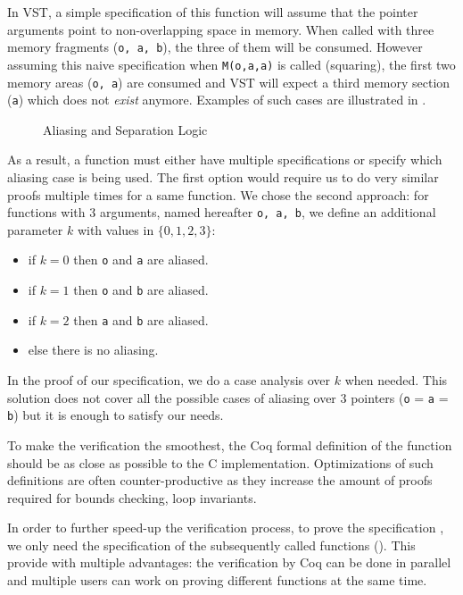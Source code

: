 In VST, a simple specification of this function will assume that the pointer arguments
point to non-overlapping space in memory.
When called with three memory fragments (\texttt{o, a, b}),
the three of them will be consumed. However assuming this naive specification
when \texttt{M(o,a,a)} is called (squaring), the first two memory areas (\texttt{o, a})
are consumed and VST will expect a third memory section (\texttt{a}) which does not \emph{exist} anymore.
Examples of such cases are illustrated in .
\begin{figure}[h]%
      \centering%
      \caption{Aliasing and Separation Logic}%
      \label{tikz:MemSame}%
\end{figure}
As a result, a function must either have multiple specifications or specify which
aliasing case is being used.
The first option would require us to do very similar proofs multiple times for a same function.
We chose the second approach: for functions with 3 arguments, named hereafter \texttt{o, a, b},
we define an additional parameter $k$ with values in $\{0,1,2,3\}$:
\begin{itemize}
      \item if $k=0$ then \texttt{o} and \texttt{a} are aliased.
      \item if $k=1$ then \texttt{o} and \texttt{b} are aliased.
      \item if $k=2$ then \texttt{a} and \texttt{b} are aliased.
      \item else there is no aliasing.
\end{itemize}
In the proof of our specification, we do a case analysis over $k$ when needed.
This solution does not cover all the possible cases of aliasing over 3 pointers
(\eg \texttt{o} = \texttt{a} = \texttt{b}) but it is enough to satisfy our needs.

To make the verification the smoothest, the Coq formal definition of the function
should be as close as possible to the C implementation.
Optimizations of such definitions are often counter-productive as they increase the
amount of proofs required for \eg bounds checking, loop invariants.

In order to further speed-up the verification process, to prove the specification
, we only need the specification of the subsequently
called functions (\eg {}).
This provide with multiple advantages: the verification by Coq can be
done in parallel and multiple users can work on proving different functions at
the same time.
